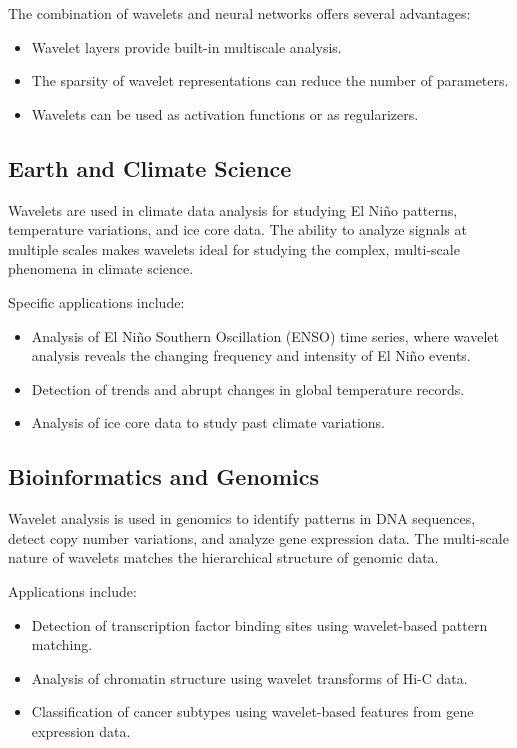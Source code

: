 The combination of wavelets and neural networks offers several advantages:
\begin{itemize}
\item Wavelet layers provide built-in multiscale analysis.
\item The sparsity of wavelet representations can reduce the number of parameters.
\item Wavelets can be used as activation functions or as regularizers.
\end{itemize}

\subsection{Earth and Climate Science}

Wavelets are used in climate data analysis for studying El Ni\~no patterns, temperature variations, and ice core data. The ability to analyze signals at multiple scales makes wavelets ideal for studying the complex, multi-scale phenomena in climate science.

Specific applications include:
\begin{itemize}
\item Analysis of El Ni\~no Southern Oscillation (ENSO) time series, where wavelet analysis reveals the changing frequency and intensity of El Ni\~no events.
\item Detection of trends and abrupt changes in global temperature records.
\item Analysis of ice core data to study past climate variations.
\end{itemize}

\subsection{Bioinformatics and Genomics}

Wavelet analysis is used in genomics to identify patterns in DNA sequences, detect copy number variations, and analyze gene expression data. The multi-scale nature of wavelets matches the hierarchical structure of genomic data.

Applications include:
\begin{itemize}
\item Detection of transcription factor binding sites using wavelet-based pattern matching.
\item Analysis of chromatin structure using wavelet transforms of Hi-C data.
\item Classification of cancer subtypes using wavelet-based features from gene expression data.
\end{itemize}


